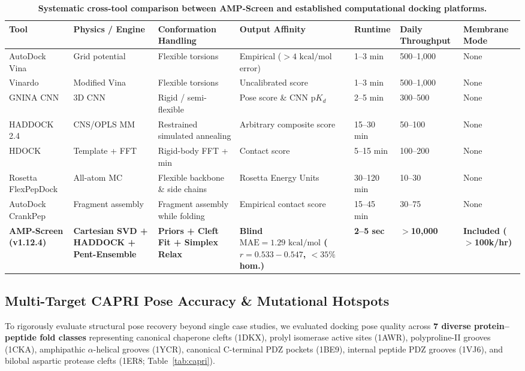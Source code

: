 \documentclass[10pt,twocolumn]{article}
\begin{document}
\begin{table}[t]
\centering
\small
\caption{\textbf{Systematic cross-tool comparison between AMP-Screen and established computational docking platforms.}}
\label{tab:tools}
\begin{tabularx}{\textwidth}{lXXXXXX}
\toprule
\textbf{Tool} & \textbf{Physics / Engine} & \textbf{Conformation Handling} & \textbf{Output Affinity} & \textbf{Runtime} & \textbf{Daily Throughput} & \textbf{Membrane Mode} \\
\midrule
AutoDock Vina & Grid potential & Flexible torsions & Empirical ($>4\text{ kcal/mol}$ error) & 1--3 min & 500--1,000 & None \\
Vinardo & Modified Vina & Flexible torsions & Uncalibrated score & 1--3 min & 500--1,000 & None \\
GNINA CNN & 3D CNN & Rigid / semi-flexible & Pose score \& CNN $\text{p}K_d$ & 2--5 min & 300--500 & None \\
HADDOCK 2.4 & CNS/OPLS MM & Restrained simulated annealing & Arbitrary composite score & 15--30 min & 50--100 & None \\
HDOCK & Template + FFT & Rigid-body FFT + min & Contact score & 5--15 min & 100--200 & None \\
Rosetta FlexPepDock & All-atom MC & Flexible backbone \& side chains & Rosetta Energy Units & 30--120 min & 10--30 & None \\
AutoDock CrankPep & Fragment assembly & Fragment assembly while folding & Empirical contact score & 15--45 min & 30--75 & None \\
\textbf{AMP-Screen (v1.12.4)} & \textbf{Cartesian SVD + HADDOCK + Pent-Ensemble} & \textbf{Priors + Cleft Fit + Simplex Relax} & \textbf{Blind $\text{MAE}=1.29\text{ kcal/mol}$ ($r=0.533 - 0.547$, $<35\%$ hom.)} & \textbf{2--5 sec} & \textbf{$>$10,000} & \textbf{Included ($>$100k/hr)} \\
\bottomrule
\end{tabularx}
\end{table}

\subsection{Multi-Target CAPRI Pose Accuracy \& Mutational Hotspots}
To rigorously evaluate structural pose recovery beyond single case studies, we evaluated docking pose quality across \textbf{7 diverse protein--peptide fold classes} representing canonical chaperone clefts (1DKX), prolyl isomerase active sites (1AWR), polyproline-II grooves (1CKA), amphipathic $\alpha$-helical grooves (1YCR), canonical C-terminal PDZ pockets (1BE9), internal peptide PDZ grooves (1VJ6), and bilobal aspartic protease clefts (1ER8; Table~\ref{tab:capri}).
\end{document}

